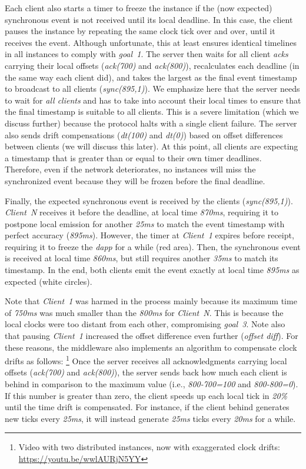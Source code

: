 \documentclass[sigplan,screen]{acmart}
\newcommand{\dapp}{\emph{dapp}\xspace}
\begin{document}
Each client also starts a timer to freeze the instance if the (now expected)
synchronous event is not received until its local deadline.
In this case, the client pauses the instance by repeating the same clock tick
over and over, until it receives the event.
Although unfortunate, this at least ensures identical timelines in all
instances to comply with \emph{goal~1}.
%
The server then waits for all client \emph{acks} carrying their local offsets
(\emph{ack(700)} and \emph{ack(800)}), recalculates each deadline (in the same
way each client did), and takes the largest as the final event timestamp to
broadcast to all clients (\emph{sync(895,1)}).
We emphasize here that the server needs to wait for \emph{all clients} and has
to take into account their local times to ensure that the final timestamp is
suitable to all clients.
This is a severe limitation (which we discuss further) because the protocol
halts with a single client failure.
%
The server also sends drift compensations (\emph{dt(100)} and \emph{dt(0)})
based on offset differences between clients (we will discuss this later).
At this point, all clients are expecting a timestamp that is greater than or
equal to their own timer deadlines.
Therefore, even if the network deteriorates, no instances will miss the
synchronized event because they will be frozen before the final deadline.

Finally, the expected synchronous event is received by the clients
(\emph{sync(895,1)}).
\emph{Client~N} receives it before the deadline, at local time \emph{870ms},
requiring it to postpone local emission for another \emph{25ms} to match the
event timestamp with perfect accuracy (\emph{895ms}).
However, the timer at \emph{Client~1} expires before receipt, requiring it to
freeze the \dapp for a while (red area).
Then, the synchronous event is received at local time \emph{860ms}, but still
requires another \emph{35ms} to match its timestamp.
In the end, both clients emit the event exactly at local time \emph{895ms} as
expected (white circles).

Note that \emph{Client~1} was harmed in the process mainly because its maximum
time of \emph{750ms} was much smaller than the \emph{800ms} for \emph{Client~N}.
This is because the local clocks were too distant from each other, compromising
\emph{goal~3}.
Note also that pausing \emph{Client~1} increased the offset difference even
further (\emph{offset diff}).
%
For these reasons, the middleware also implements an algorithm to compensate
clock drifts as follows:%
\footnote {
    Video with two distributed instances, now with exaggerated clock drifts:
    \url{https://youtu.be/wwlAURjN5YY}
}
Once the server receives all acknowledgments carrying local offsets
(\emph{ack(700)} and \emph{ack(800)}), the server sends back how much each
client is behind in comparison to the maximum value (i.e., \emph{800-700=100}
and \emph{800-800=0}).
If this number is greater than zero, the client speeds up each local tick in
\emph{20\%} until the time drift is compensated.
For instance, if the client behind generates new ticks every \emph{25ms}, it
will instead generate \emph{25ms} ticks every \emph{20ms} for a while.
\end{document}
